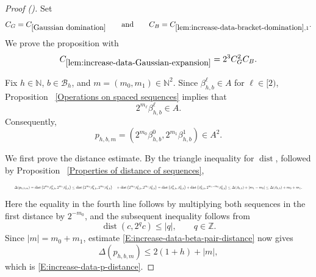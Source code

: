 \documentclass[12pt,reqno]{amsart}
\newcommand{\auto}{{({\tiny\faCar})}}
\theoremstyle{plain}
\numberwithin{equation}{section}
\theoremstyle{remark}
\DeclareMathOperator{\dist}{dist}
\begin{document}
\begin{proof}[Proof \auto]
Set
\[
C_G=C_{\ref{Gaussian domination}}
\qquad\text{and}\qquad
C_B=C_{\ref{lem:increase-data-bracket-domination},1}.
\]
We prove the proposition with
\begin{equation}
    \label{E:increase-data-Gaussian-expansion-constant}
    C_{\ref{lem:increase-data-Gaussian-expansion}}
    =
    2^3C_G^2C_B.
\end{equation}

Fix \(h\in\mathbb N\), \(b\in\mathcal B_h\), and
\(m=(m_0,m_1)\in\mathbb N^2\). Since
\(\beta_{h,b}^\ell\in A\) for \(\ell\in[2)\), Proposition~
\ref{Operations on spaced sequences} implies that
\[
2^{m_\ell}\beta_{h,b}^\ell\in A.
\]
Consequently,
\[
p_{h,b,m}
=
\left(
2^{m_0}\beta_{h,b}^0,
2^{m_1}\beta_{h,b}^1
\right)
\in A^2.
\]

We first prove the distance estimate. By the triangle inequality
for \(\dist\), followed by Proposition~
\ref{Properties of distance of sequences},
\[
\resizebox{0.98\textwidth}{!}{$\displaystyle \Delta(p_{h,b,m}) = \dist\left( 2^{m_0}\beta_{h,b}^0, 2^{m_1}\beta_{h,b}^1 \right) \leq \dist\left( 2^{m_0}\beta_{h,b}^0, 2^{m_0}\beta_{h,b}^1 \right) \quad+ \dist\left( 2^{m_0}\beta_{h,b}^1, 2^{m_1}\beta_{h,b}^1 \right) = \dist\left( \beta_{h,b}^0, \beta_{h,b}^1 \right) + \dist\left( \beta_{h,b}^1, 2^{m_1-m_0}\beta_{h,b}^1 \right) \leq \Delta(\beta_{h,b}) + |m_1-m_0| \leq \Delta(\beta_{h,b}) + m_0+m_1.$}
\]
Here the equality in the fourth line follows by multiplying both
sequences in the first distance by \(2^{-m_0}\), and the subsequent
inequality follows from
\[
\dist(c,2^qc)\leq |q|,
\qquad q\in\mathbb Z.
\]
Since \(|m|=m_0+m_1\), estimate
\eqref{E:increase-data-beta-pair-distance} now gives
\[
\Delta(p_{h,b,m})
\leq
2(1+h)
+
|m|,
\]
which is \eqref{E:increase-data-p-distance}.


\end{proof}
\end{document}
